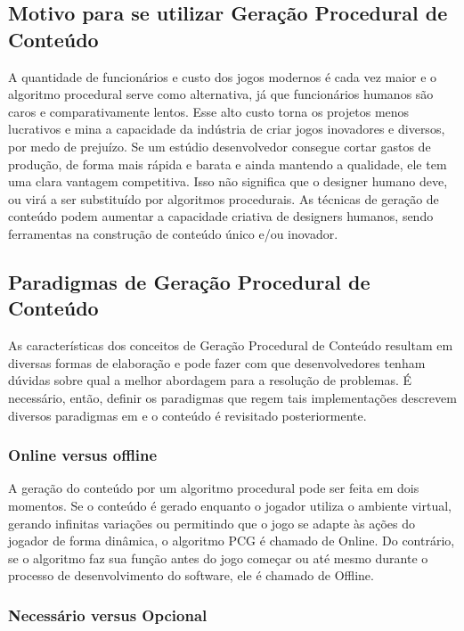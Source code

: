\documentclass[12pt]{article}
\begin{document}
\subsection{Motivo para se utilizar Geração Procedural de Conteúdo}

A quantidade de funcionários e custo dos jogos modernos é cada vez maior e o algoritmo procedural serve como alternativa, já que funcionários humanos são caros e comparativamente lentos. Esse alto custo torna os projetos menos lucrativos e mina a capacidade da indústria de criar jogos inovadores e diversos, por medo de prejuízo. Se um estúdio desenvolvedor consegue cortar gastos de produção, de forma mais rápida e barata e ainda mantendo a qualidade, ele tem uma clara vantagem competitiva. Isso não significa que o designer humano deve, ou virá a ser substituído por algoritmos procedurais. As técnicas de geração de conteúdo podem aumentar a capacidade criativa de designers humanos, sendo ferramentas na construção de conteúdo único e/ou inovador.

\subsection{Paradigmas de Geração Procedural de Conteúdo}

As características dos conceitos de Geração Procedural de Conteúdo resultam em diversas formas de elaboração e pode fazer com que desenvolvedores tenham dúvidas sobre qual a melhor abordagem para a resolução de problemas. É necessário, então, definir os paradigmas que regem tais implementações descrevem diversos paradigmas em e o conteúdo é revisitado posteriormente. 

\subsubsection{Online versus offline}

A geração do conteúdo por um algoritmo procedural pode ser feita em dois momentos. Se o conteúdo é gerado enquanto o jogador utiliza o ambiente virtual, gerando infinitas variações ou permitindo que o jogo se adapte às ações do jogador de forma dinâmica, o algoritmo PCG é chamado de Online. Do contrário, se o algoritmo faz sua função antes do jogo começar ou até mesmo durante o processo de desenvolvimento do software, ele é chamado de Offline. 

\subsubsection{Necessário versus Opcional }
\end{document}
